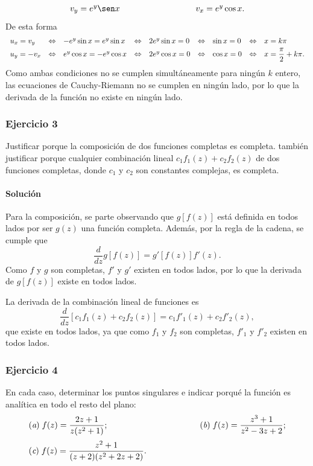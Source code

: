 \documentclass[a4paper]{report}
\begin{document}
\begin{enumerate}
\[\begin{array}{ll}
  v_y=e^y\sen x\qquad\qquad\qquad\qquad&v_x=e^y\cos x.
 \end{array}
 \]
 De esta forma
 \[
 \begin{array}{lllllllll}
  u_x=v_y&\Leftrightarrow&-e^y\sin x=e^y\sin x&\Leftrightarrow&2e^y\sin x=0&\Leftrightarrow&\sin x=0&\Leftrightarrow&x=k\pi\\[\smallskipamount]
  u_y=-v_x&\Leftrightarrow&e^y\cos x=-e^y\cos x&\Leftrightarrow&2e^y\cos x=0&\Leftrightarrow&\cos x=0&\Leftrightarrow&x=\dfrac{\pi}{2}+k\pi.
 \end{array}
 \] 
 Como ambas condiciones no se cumplen simultáneamente para ningún \(k\) entero, las ecuaciones de Cauchy-Riemann no se cumplen en ningún lado, por lo que la derivada de la función no existe en ningún lado. 
\end{enumerate}

\subsubsection{Ejercicio 3}

Justificar porque la composición de dos funciones completas es completa. también justificar porque cualquier combinación lineal \(c_1f_1(z)+c_2f_2(z)\) de dos funciones completas, donde \(c_1\) y \(c_2\) son constantes complejas, es completa.

\paragraph{Solución} Para la composición, se parte observando que \(g[f(z)]\) está definida en todos lados por ser \(g(z)\) una función completa. Además, por la regla de la cadena, se cumple que
\[
 \frac{d}{dz}g[f(z)]=g'[f(z)]f'(z).
\]
Como \(f\) y \(g\) son completas, \(f'\) y \(g'\) existen en todos lados, por lo que la derivada de \(g[f(z)]\) existe en todos lados.

La derivada de la combinación lineal de funciones es 
\[
 \frac{d}{dz}[c_1f_1(z)+c_2f_2(z)]=c_1f'_1(z)+c_2f'_2(z),
\]
que existe en todos lados, ya que como \(f_1\) y \(f_2\) son completas, \(f'_1\) y \(f'_2\) existen en todos lados. 

\subsubsection{Ejercicio 4}

En cada caso, determinar los puntos singulares e indicar porqué la función es analítica en todo el resto del plano:
\[
 \begin{array}{ll}
  (\textit{a})\;f(z)=\dfrac{2z+1}{z(z^2+1)};\qquad\qquad\qquad\qquad\qquad&(\textit{b})\;f(z)=\dfrac{z^3+1}{z^2-3z+2};\\[\bigskipamount]
  (\textit{c})\;f(z)=\dfrac{z^2+1}{(z+2)(z^2+2z+2)}.
 \end{array}
\]
\end{document}
